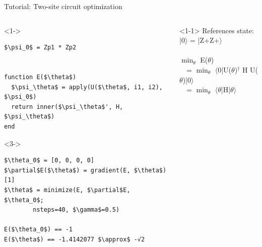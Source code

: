 \begin{frame}[fragile]{Tutorial: Two-site circuit optimization}

\begin{columns}

\begin{column}{5cm}

\begin{onlyenv}<1->
\begin{lstlisting}[language=JuliaLocal, style=julia, mathescape, basicstyle=\scriptsize\ttfamily]
$\psi_0$ = Zp1 * Zp2


function E($\theta$)
  $\psi_\theta$ = apply(U($\theta$, i1, i2), $\psi_0$)
  return inner($\psi_\theta$', H, $\psi_\theta$)
end
\end{lstlisting}
\end{onlyenv}

\begin{onlyenv}<3->
\begin{lstlisting}[language=JuliaLocal, style=julia, mathescape, basicstyle=\scriptsize\ttfamily]
$\theta_0$ = [0, 0, 0, 0]
$\partial$E($\theta$) = gradient(E, $\theta$)[1]
$\theta$ = minimize(E, $\partial$E, $\theta_0$;
        nsteps=40, $\gamma$=0.5)

E($\theta_0$) == -1
E($\theta$) == -1.4142077 $\approx$ -√2
\end{lstlisting}
\end{onlyenv}

\end{column}

\begin{column}{5cm}

\begin{onlyenv}<1-1>
References state: \\
|0$\rangle$ = |Z+Z+$\rangle$ \\
~\\
$\min_{\theta}$ E($\theta$)\\
\ \ = $\min_{\theta}$ $\langle$0|U($\theta$)$^\dagger$ H U($\theta$)|0$\rangle$ \\
\ \ = $\min_{\theta}$ $\langle\theta$|H|$\theta\rangle$ \\
\end{onlyenv}


\end{column}
\end{columns}
\end{frame}
